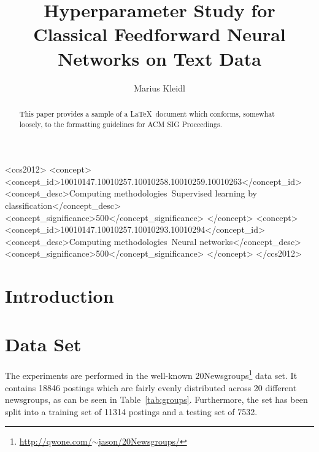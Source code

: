 \documentclass[sigconf]{acmart}
\begin{document}
\title{Hyperparameter Study for Classical Feedforward Neural Networks on Text Data}

\author{Marius Kleidl}


\renewcommand{\shortauthors}{B. Trovato et al.}


\begin{abstract}
This paper provides a sample of a \LaTeX\ document which conforms,
somewhat loosely, to the formatting guidelines for
ACM SIG Proceedings.
\end{abstract}

%
%
 \begin{CCSXML}
	<ccs2012>
	<concept>
	<concept_id>10010147.10010257.10010258.10010259.10010263</concept_id>
	<concept_desc>Computing methodologies~Supervised learning by classification</concept_desc>
	<concept_significance>500</concept_significance>
	</concept>
	<concept>
	<concept_id>10010147.10010257.10010293.10010294</concept_id>
	<concept_desc>Computing methodologies~Neural networks</concept_desc>
	<concept_significance>500</concept_significance>
	</concept>
	</ccs2012>
\end{CCSXML}





\maketitle

\section{Introduction}

\section{Data Set}

The experiments are performed in the well-known 20Newsgroups\footnote{\href{http://qwone.com/~jason/20Newsgroups/}{http://qwone.com/$\sim$jason/20Newsgroups/}} data set. It contains 18846 postings which are fairly evenly distributed across 20 different newsgroups, as can be seen in Table~\ref{tab:groups}. Furthermore, the set has been split into a training set of 11314 postings and a testing set of 7532.
\end{document}

